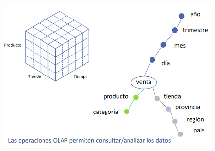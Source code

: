 \documentclass[a4paper,11pt]{article}
\begin{document}
\begin{figure}[h]
\centering
\includegraphics[scale=1,width=1\textwidth]{modelado_dimensional.png}
\end{figure}
\end{document}
